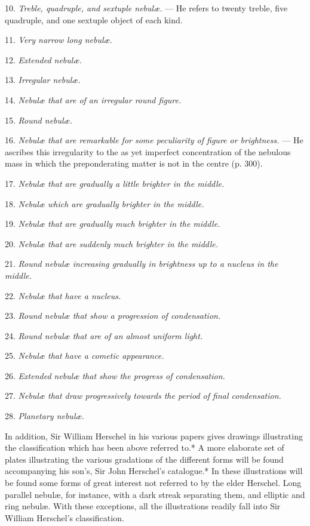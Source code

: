 \documentclass[a4paper, 12pt, oneside, polutonikogreek, english]{article}
\begin{document}
10. \emph{Treble, quadruple, and sextuple nebulæ.} --- He refers to twenty treble, five quadruple, and one sextuple object of each kind.

11. \emph{Very narrow long nebulæ.}

12. \emph{Extended nebulæ.}

13. \emph{Irregular nebulæ.}

14. \emph{Nebulæ that are of an irregular round figure.}

15. \emph{Round nebulæ.}

16. \emph{Nebulæ that are remarkable for some peculiarity of figure or brightness.} --- He ascribes this irregularity to the as yet imperfect concentration of the nebulous mass in which the preponderating matter is not in the centre (p. 300).

17. \emph{Nebulæ that are gradually a little brighter in the middle.}

18. \emph{Nebulæ which are gradually brighter in the middle.}

19. \emph{Nebulæ that are gradually much brighter in the middle.}

20. \emph{Nebulæ that are suddenly much brighter in the middle.}

21. \emph{Round nebulæ increasing gradually in brightness up to a nucleus in the middle.}

22. \emph{Nebulæ that have a nucleus.}

23. \emph{Round nebulæ that show a progression of condensation.}

24. \emph{Round nebulæ that are of an almost uniform light.}

25. \emph{Nebulæ that have a cometic appearance.}

26. \emph{Extended nebulæ that show the progress of condensation.}

27. \emph{Nebulæ that draw progressively towards the period of final condensation.}

28. \emph{Planetary nebulæ.}

In addition, Sir William Herschel in his various papers gives drawings illustrating the classification which has been above referred to.* A more elaborate set of plates illustrating the various gradations of the different forms will be found accompanying his son's, Sir John Herschel's catalogue.* In these illustrations will be found some forms of great interest not referred to by the elder Herschel. Long parallel nebulæ, for instance, with a dark streak separating them, and elliptic and ring nebulæ. With these exceptions, all the illustrations readily fall into Sir William Herschel's classification.
\end{document}

